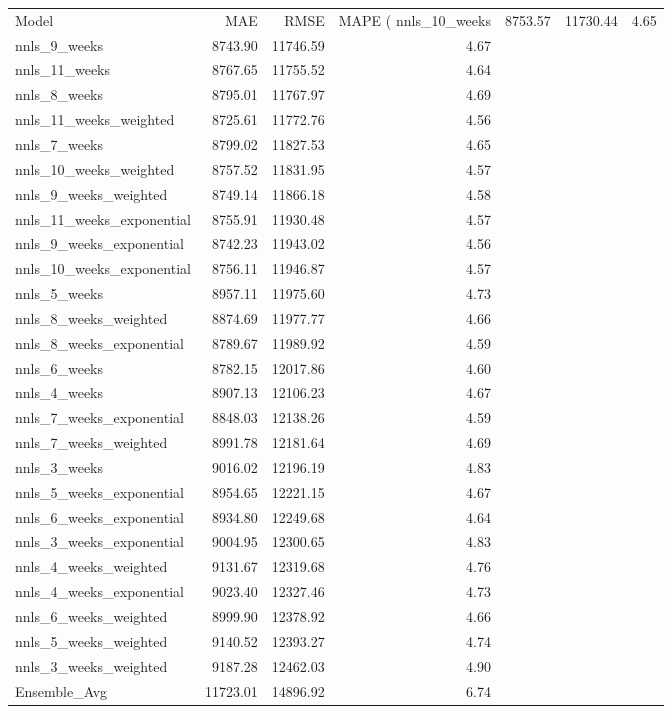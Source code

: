 \begin{tabular}{lrrr}
\toprule
Model & MAE & RMSE & MAPE (%
\midrule
nnls_10_weeks & 8753.57 & 11730.44 & 4.65 \\
nnls_9_weeks & 8743.90 & 11746.59 & 4.67 \\
nnls_11_weeks & 8767.65 & 11755.52 & 4.64 \\
nnls_8_weeks & 8795.01 & 11767.97 & 4.69 \\
nnls_11_weeks_weighted & 8725.61 & 11772.76 & 4.56 \\
nnls_7_weeks & 8799.02 & 11827.53 & 4.65 \\
nnls_10_weeks_weighted & 8757.52 & 11831.95 & 4.57 \\
nnls_9_weeks_weighted & 8749.14 & 11866.18 & 4.58 \\
nnls_11_weeks_exponential & 8755.91 & 11930.48 & 4.57 \\
nnls_9_weeks_exponential & 8742.23 & 11943.02 & 4.56 \\
nnls_10_weeks_exponential & 8756.11 & 11946.87 & 4.57 \\
nnls_5_weeks & 8957.11 & 11975.60 & 4.73 \\
nnls_8_weeks_weighted & 8874.69 & 11977.77 & 4.66 \\
nnls_8_weeks_exponential & 8789.67 & 11989.92 & 4.59 \\
nnls_6_weeks & 8782.15 & 12017.86 & 4.60 \\
nnls_4_weeks & 8907.13 & 12106.23 & 4.67 \\
nnls_7_weeks_exponential & 8848.03 & 12138.26 & 4.59 \\
nnls_7_weeks_weighted & 8991.78 & 12181.64 & 4.69 \\
nnls_3_weeks & 9016.02 & 12196.19 & 4.83 \\
nnls_5_weeks_exponential & 8954.65 & 12221.15 & 4.67 \\
nnls_6_weeks_exponential & 8934.80 & 12249.68 & 4.64 \\
nnls_3_weeks_exponential & 9004.95 & 12300.65 & 4.83 \\
nnls_4_weeks_weighted & 9131.67 & 12319.68 & 4.76 \\
nnls_4_weeks_exponential & 9023.40 & 12327.46 & 4.73 \\
nnls_6_weeks_weighted & 8999.90 & 12378.92 & 4.66 \\
nnls_5_weeks_weighted & 9140.52 & 12393.27 & 4.74 \\
nnls_3_weeks_weighted & 9187.28 & 12462.03 & 4.90 \\
Ensemble_Avg & 11723.01 & 14896.92 & 6.74 \\
\bottomrule
\end{tabular}
